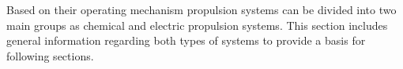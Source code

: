 \par Based on their operating mechanism propulsion systems can be divided into two main groups as chemical and electric propulsion systems. This section includes general information regarding both types of systems to provide a basis for following sections. 














